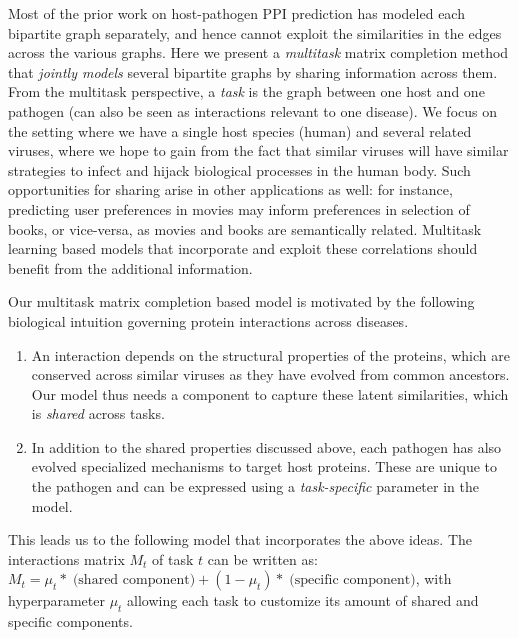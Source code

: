 \documentclass{bioinfo}
\begin{document}
Most of the prior work on host-pathogen PPI prediction has modeled each bipartite graph separately, and hence cannot exploit the similarities 
in the edges across the various graphs. Here we present a \textit{multitask} matrix completion method that \textit{jointly models} 
several bipartite graphs by sharing information across them. 
From the multitask perspective, a \textit{task} is the graph between one host and one pathogen (can also be seen as interactions relevant to one disease). 
We focus on the setting where we have a single host species (human) and several related viruses, where we hope to gain from the 
fact that similar viruses will have similar strategies to infect and hijack biological processes in the human body.
Such opportunities for sharing arise in other applications as well: for instance, predicting user preferences in movies may inform preferences in selection of books, 
or vice-versa, as movies and books are semantically related. Multitask learning based models that incorporate and exploit these correlations should benefit from 
the additional information.%

Our multitask matrix completion based model is motivated by the following biological intuition governing protein interactions across diseases.
\begin{enumerate}
\item An interaction depends on the structural properties of the proteins, which are conserved across similar viruses as they have evolved from common ancestors. Our model thus needs a component to capture these latent similarities, which is \textit{shared} across tasks.
\item In addition to the shared properties discussed above, each pathogen has also evolved specialized mechanisms to target host proteins. These are unique to the pathogen and can be expressed using a \textit{task-specific} parameter in the model.
\end{enumerate}

This leads us to the following model that incorporates the above ideas. The interactions matrix $M_t$ of task $t$ can be written as: $M_t = \mu_t *\; \textrm{(shared component)} + (1-\mu_t) *\; \textrm{(specific component)} $, with hyperparameter $\mu_t$ allowing each task to customize its amount of shared and specific components.
\end{document}
